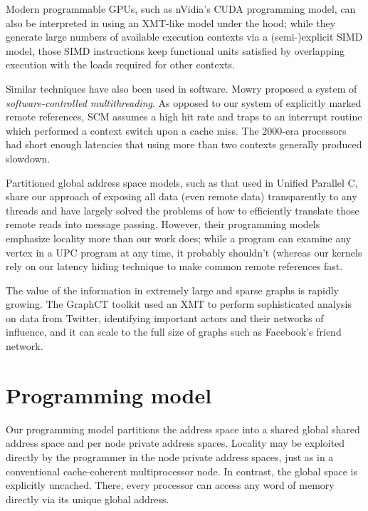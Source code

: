 \documentclass{acm_proc_article-sp}
\begin{document}
Modern programmable GPUs, such as nVidia's CUDA programming model, can also be interpreted in using an XMT-like
model under the hood;
while they generate large numbers of available execution contexts via
a (semi-)explicit SIMD model, those SIMD instructions keep functional
units satisfied by overlapping execution with the loads required for
other contexts.

Similar techniques have also been used in software.  Mowry proposed a system \cite{mowry-scm} of \emph{software-controlled
  multithreading}.  As opposed to our system of explicitly marked
remote references, SCM assumes a high hit rate and traps to an
interrupt routine which performed a context switch upon a cache miss.  The 2000-era processors had
short enough latencies that using more than two contexts generally
produced slowdown.

Partitioned global address space models, such as that used in Unified Parallel C,
 share our approach of exposing all data (even remote data)
 transparently to any threads and have largely solved the problems of
 how to efficiently translate those remote reads into message
 passing.  However, their programming models emphasize locality more
 than our work does; while a program can examine any vertex in a UPC
 program at any time, it probably shouldn't (whereas our kernels rely on our
 latency hiding technique to make common remote references fast.

The value of the information in extremely large and sparse graphs is
rapidly growing.  The GraphCT toolkit \cite{ediger-graphct} used an XMT to perform
sophisticated analysis on data from Twitter, identifying important
actors and their networks of influence, and it can scale to the full
size of graphs such as Facebook's friend network.
\section{Programming model}
\label{sec:model}

Our programming model partitions the address space into a shared
global shared address space and per node private address spaces.
Locality may be exploited directly by the programmer in the node
private address spaces, just as in a conventional cache-coherent
multiprocessor node.  In contrast, the global space is explicitly
uncached.  There, every processor can access any word of memory
directly via its unique global address.  
\end{document}

